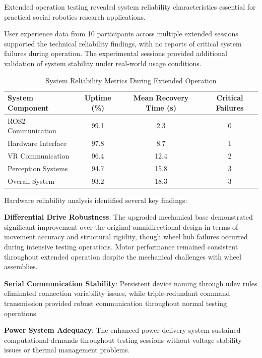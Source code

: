 Extended operation testing revealed system reliability characteristics essential for practical social robotics research applications.

User experience data from 10 participants across multiple extended sessions supported the technical reliability findings, with no reports of critical system failures during operation. The experimental sessions provided additional validation of system stability under real-world usage conditions.

\begin{table}[H]
    \centering
    \begin{tabular}{|l|c|c|c|}
        \hline
        \textbf{System Component} & \textbf{Uptime (\%)} & \textbf{Mean Recovery Time (s)} & \textbf{Critical Failures} \\
        \hline
        ROS2 Communication & 99.1 & 2.3 & 0 \\
        Hardware Interface & 97.8 & 8.7 & 1 \\
        VR Communication & 96.4 & 12.4 & 2 \\
        Perception Systems & 94.7 & 15.8 & 3 \\
        Overall System & 93.2 & 18.3 & 3 \\
        \hline
    \end{tabular}
    \caption{System Reliability Metrics During Extended Operation}
    \label{tab:system_reliability}
\end{table}

Hardware reliability analysis identified several key findings:

\textbf{Differential Drive Robustness}: The upgraded mechanical base demonstrated significant improvement over the original omnidirectional design in terms of movement accuracy and structural rigidity, though wheel hub failures occurred during intensive testing operations. Motor performance remained consistent throughout extended operation despite the mechanical challenges with wheel assemblies.

\textbf{Serial Communication Stability}: Persistent device naming through udev rules eliminated connection variability issues, while triple-redundant command transmission provided robust communication throughout normal testing operations.

\textbf{Power System Adequacy}: The enhanced power delivery system sustained computational demands throughout testing sessions without voltage stability issues or thermal management problems.

